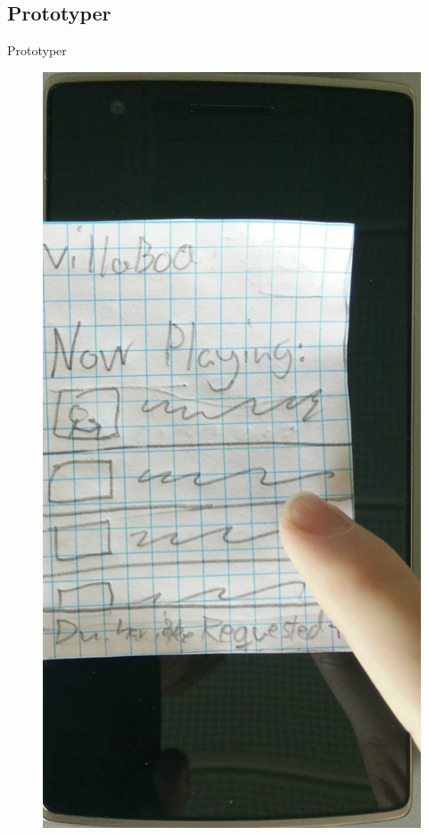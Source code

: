 \subsection{Prototyper}
\begin{frame}{Prototyper}
	\begin{figure}
		\centering
		\includegraphics{slides/Heider/paperPrototypeVoteInteraction}
	\end{figure}
\end{frame}
